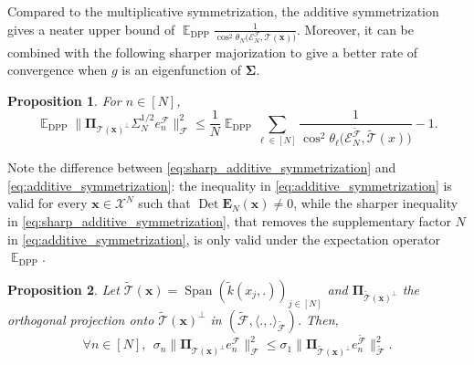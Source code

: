 \documentclass[twoside,11pt]{book}
\newtheorem{proposition}{Proposition}
\DeclareMathOperator{\Det}{Det}
\DeclareMathOperator{\Span}{\mathrm{Span}}
\DeclareMathOperator{\DPP}{\mathrm{DPP}}
\DeclareMathOperator{\EX}{\mathbb{E}}
\begin{document}
Compared to the multiplicative symmetrization, the additive symmetrization gives a neater upper bound of $\displaystyle \EX_{\DPP}  \frac{1}{\cos^{2} \theta_{N} \bigg(\mathcal{E}^{\mathcal{F}}_{N}, \mathcal{T}(\bm{x}) \bigg)}$. Moreover, it can be combined with the following sharper majorization to give a better rate of convergence when $g$ is an eigenfunction of $\bm{\Sigma}$.
\begin{proposition}\label{lemma:sharp_additive_symmetrization}
For $n \in [N]$,
\begin{equation}\label{eq:sharp_additive_symmetrization}
\EX_{\DPP} \|\bm{\Pi}_{\mathcal{T}(\bm{x})^{\perp}} \Sigma_{N}^{1/2} e_{n}^{\mathcal{F}}\|_{\mathcal{F}}^{2}  \leq \frac{1}{N} \EX_{\DPP} \sum\limits_{\ell \in [N]} \frac{1}{\cos^{2} \theta_{\ell}\bigg(\mathcal{E}^{\tilde{\mathcal{F}}}_{N}, \tilde{\mathcal{T}}(x) \bigg)} -1.
\end{equation}
\end{proposition}
Note the difference between \eqref{eq:sharp_additive_symmetrization} and \eqref{eq:additive_symmetrization}: the inequality in \eqref{eq:additive_symmetrization} is valid for every $\bm{x} \in \mathcal{X}^{N}$ such that $\Det \bm{E}_{N}(\bm{x}) \neq 0$, while the sharper inequality in \eqref{eq:sharp_additive_symmetrization}, that removes the supplementary factor $N$ in \eqref{eq:additive_symmetrization}, is only valid under the expectation operator $\EX_{\DPP}$.


\begin{proposition}\label{prop:strong_kernel_perturbation_inequality}
Let $ \tilde{\mathcal{T}}(\bm{x}) = \Span \left( \tilde{k}(x_{j},.) \right)_{j \in [N]}$ and $\bm{\Pi}_{\tilde{\mathcal{T}}(\bm{x})^{\perp}}$ the orthogonal projection onto $\tilde{\mathcal{T}}(\bm{x})^{\perp}$ in $(\tilde{\mathcal{F}}, \langle .,.\rangle_{\tilde{\mathcal{F}}})$. Then,
\begin{equation}\label{eq:kernel_perturbation_inequality}
	\forall n \in [N], \:\: \sigma_{n} \|\bm{\Pi}_{\mathcal{T}(\bm{x})^{\perp}} e_{n}^{\mathcal{F}}\|_{\mathcal{F}}^{2} \leq \sigma_{1}   \|\bm{\Pi}_{\tilde{\mathcal{T}}(\bm{x})^{\perp}} e_{n}^{\tilde{\mathcal{F}}}\|_{\tilde{\mathcal{F}}}^{2}.
\end{equation}
\end{proposition}
\end{document}
